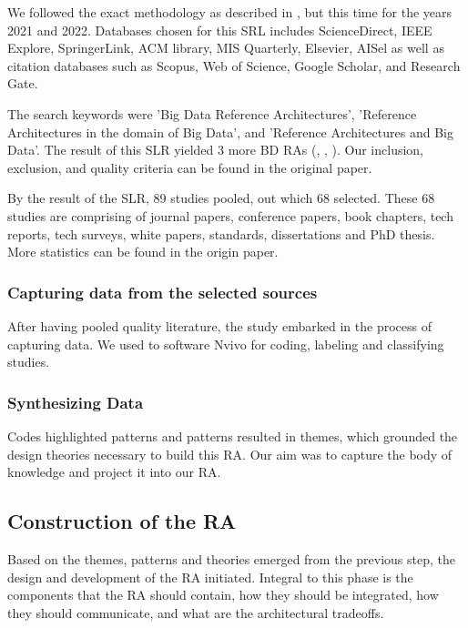 \documentclass[runningheads]{llncs}
\begin{document}
We followed the exact methodology as described in \cite{AtaeiACIS}, but this time for the years 2021 and 2022. Databases chosen for this SRL includes ScienceDirect, IEEE Explore, SpringerLink, ACM
library, MIS Quarterly, Elsevier, AISel as well as citation databases such as Scopus, Web of Science, Google Scholar, and Research Gate. 

The search keywords were  ’Big Data Reference Architectures’, ’Reference Architectures in the domain of Big Data’, and ’Reference Architectures and Big Data’. The result of this SLR yielded 3 more BD RAs (\cite{castellanos2021smart}, \cite{sang2017simplifying}, \cite{AtaeiApsec}). Our inclusion, exclusion, and quality criteria can be found in the original paper. 

By the result of the SLR, 89 studies pooled, out which 68 selected. These 68 studies are comprising of journal papers, conference papers, book chapters, tech reports, tech surveys, white papers, standards, dissertations and PhD thesis. More statistics can be found in the origin paper. 

\subsubsection{Capturing data from the selected sources\\}
After having pooled quality literature, the study embarked in the process of capturing data. We used to software Nvivo for coding, labeling and classifying studies. 

\subsubsection*{Synthesizing Data\\}
Codes highlighted patterns and patterns resulted in themes, which grounded the design theories necessary to build this RA. Our aim was to capture the body of knowledge and project it into our RA. 

\subsection{Construction of the RA}

Based on the themes, patterns and theories emerged from the previous step, the design and development of the RA initiated. Integral to this phase is the components that the RA should contain, how they should be integrated, how they should communicate, and what are the architectural tradeoffs. 
\end{document}
